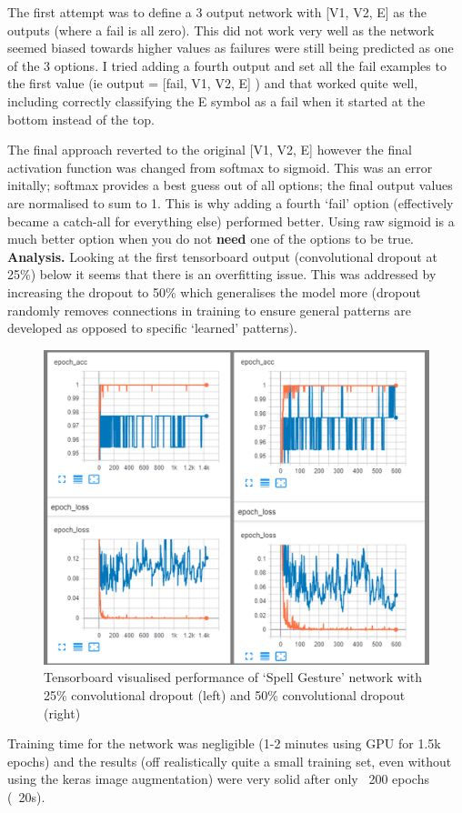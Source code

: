 \documentclass{article}
\begin{document}
The first attempt was to define a 3 output network with [V1, V2, E] as the outputs (where a fail is all zero). This did not work very well as the network seemed biased towards higher values as failures were still being predicted as one of the 3 options. I tried adding a fourth output and set all the fail examples to the first value (ie output = [fail, V1, V2, E] ) and that worked quite well, including correctly classifying the E symbol as a fail when it started at the bottom instead of the top. 

The final approach reverted to the original [V1, V2, E] however the final activation function was changed from softmax to sigmoid. This was an error initally; softmax provides a best guess out of all options; the final output values are normalised to sum to 1. This is why adding a fourth `fail' option (effectively became a catch-all for everything else) performed better. Using raw sigmoid is a much better option when you do not \textbf{need} one of the options to be true. \\

\textbf{Analysis.} Looking at the first tensorboard output (convolutional dropout at 25\%) below it seems that there is an overfitting issue. This was addressed by increasing the dropout to 50\% which generalises the model more (dropout randomly removes connections in training to ensure general patterns are developed as opposed to specific `learned' patterns).

\begin{figure}[h!]
	\centering
	\includegraphics[width=0.5\linewidth]{symbolPerformance.png}
	\caption{Tensorboard visualised performance of `Spell Gesture' network with 25\% convolutional dropout (left) and 50\% convolutional dropout (right)}
	\label{symbolPerformance}
\end{figure}


Training time for the network was negligible (1-2 minutes using GPU for 1.5k epochs) and the results (off realistically quite a small training set, even without using the keras image augmentation) were very solid after only ~200 epochs (~20s).\\ 
\end{document}
